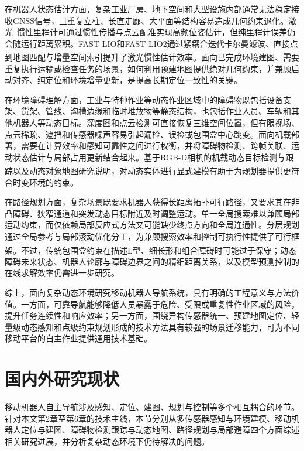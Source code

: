 在机器人状态估计方面，复杂工业厂房、地下空间和大型设施内部通常无法稳定接收GNSS信号，且重复立柱、长直走廊、大平面等结构容易造成几何约束退化。激光--惯性里程计可通过惯性传播与点云配准实现高频位姿估计，但纯里程计误差仍会随运行距离累积。FAST-LIO和FAST-LIO2通过紧耦合迭代卡尔曼滤波、直接点到地图匹配与增量空间索引提升了激光惯性估计效率\textsuperscript{\cite{Xu2021FASTLIO,Xu2022FASTLIO2,Cai2021ikdTree}}。面向已完成环境建图、需要重复执行运输或检查任务的场景，如何利用预建地图提供绝对几何约束，并兼顾启动对齐、纯定位和环境增量更新，是提高长期定位一致性的关键。

在环境障碍理解方面，工业与特种作业等动态作业区域中的障碍物既包括设备支架、货架、管线、沟槽边缘和临时堆放物等静态结构，也包括作业人员、车辆和其他机器人等动态目标。深度图和点云检测可直接恢复三维空间位置，但有限视场、点云稀疏、遮挡和传感器噪声容易引起漏检、误检或包围盒中心跳变。面向机载部署，需要在计算效率和感知可靠性之间进行权衡，并将障碍物检测、跨帧关联、运动状态估计与局部占用更新结合起来。基于RGB-D相机的机载动态目标检测与跟踪以及动态对象地图研究\textsuperscript{\cite{10323166,7271102}}说明，对动态实体进行显式建模有助于为规划器提供更符合时变环境的约束。

在路径规划方面，复杂场景既要求机器人获得长距离拓扑可行路径，又要求其在非凸障碍、狭窄通道和突发动态目标附近及时调整运动。单一全局搜索难以兼顾局部运动约束，而仅依赖局部反应式方法又可能缺少终点方向和全局连通性。分层规划通过全局参考与局部滚动优化分工，为兼顾搜索效率和控制可执行性提供了可行框架\textsuperscript{\cite{10598326,10107604}}。不过，传统包围盒约束在描述L型、细长形和组合障碍时可能过于保守；动态障碍未来状态、机器人轮廓与障碍边界之间的精细距离关系，以及模型预测控制的在线求解效率仍需进一步研究。

综上，面向复杂动态环境研究移动机器人导航系统，具有明确的工程意义与方法价值。一方面，可靠导航能够降低人员暴露于危险、受限或重复性作业区域的风险，提升任务连续性和响应效率；另一方面，围绕异构传感器统一、预建地图定位、轻量级动态感知和点级约束规划形成的技术方法具有较强的场景迁移能力，可为不同移动平台的自主作业提供通用技术基础。

\section{国内外研究现状}
移动机器人自主导航涉及感知、定位、建图、规划与控制等多个相互耦合的环节。针对本文第2章至第6章的技术主线，本节分别从多传感器感知与环境建模、移动机器人定位与建图、障碍物检测跟踪与动态地图、路径规划与局部避障四个方面综述相关研究进展，并分析复杂动态环境下仍待解决的问题。

